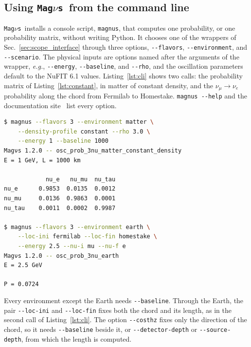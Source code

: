 \documentclass[final,5p,times,twocolumn,sort,compress]{elsarticle}
\makeatletter
\newcommand{\eg}{{\it e.g.}}
\DeclareRobustCommand{\_}{%
  \ifmmode\nfss@text{\textunderscore}\else\textunderscore\allowbreak\fi}
\newcommand{\magnus}{{\tt Mag}\ensuremath{\nu}{\tt s}}
\makeatother
\begin{document}
\subsection{Using \magnus\ from the command line}
\label{sec:cli}

\magnus\ installs a console script, {\tt magnus}, that computes one probability, or one probability matrix, without writing Python. It chooses one of the wrappers of Sec.~\ref{sec:scope_interface} through three options, {\tt -{}-flavors}, {\tt -{}-environment}, and {\tt -{}-scenario}. The physical inputs are options named after the arguments of the wrapper, \eg, {\tt -{}-energy}, {\tt -{}-baseline}, and {\tt -{}-rho}, and the oscillation parameters default to the NuFIT 6.1 values. Listing~\ref{lst:cli} shows two calls: the probability matrix of Listing~\ref{lst:constant}, in matter of constant density, and the $\nu_\mu \to \nu_e$ probability along the chord from Fermilab to Homestake. {\tt magnus -{}-help} and the documentation site\ \cite{MagnusDocs} list every option.

\begin{lstlisting}[language=bash, caption={\textbf{The command-line interface.} Two probabilities computed from the command line. The first call returns the probability matrix of Listing~\ref{lst:constant}, with a row for each initial flavor and a column for each final flavor. The second returns one channel along the chord from Fermilab to Homestake, whose length is computed from the two named locations. The oscillation parameters take their NuFIT 6.1 defaults. See Sec.~\ref{sec:cli} for details.}, label={lst:cli}, float=tbp]
$ magnus --flavors 3 --environment matter \
    --density-profile constant --rho 3.0 \
    --energy 1 --baseline 1000
Magνs 1.2.0 -- osc_prob_3nu_matter_constant_density
E = 1 GeV, L = 1000 km

            nu_e   nu_mu  nu_tau
nu_e      0.9853  0.0135  0.0012
nu_mu     0.0136  0.9863  0.0001
nu_tau    0.0011  0.0002  0.9987

$ magnus --flavors 3 --environment earth \
    --loc-ini fermilab --loc-fin homestake \
    --energy 2.5 --nu-i mu --nu-f e
Magνs 1.2.0 -- osc_prob_3nu_earth
E = 2.5 GeV

P = 0.0724
\end{lstlisting}

Every environment except the Earth needs {\tt -{}-baseline}. Through the Earth, the pair {\tt -{}-loc-ini} and {\tt -{}-loc-fin} fixes both the chord and its length, as in the second call of Listing~\ref{lst:cli}. The option {\tt -{}-costhz} fixes only the direction of the chord, so it needs {\tt -{}-baseline} beside it, or {\tt -{}-detector-depth} or {\tt -{}-source-depth}, from which the length is computed.
\end{document}
